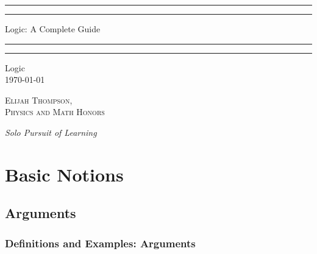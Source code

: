 \documentclass[12pt, a4paper, twoside, openright, titlepage]{book}
\begin{document}

\begin{titlepage}
    \centering
    \scshape
    \vspace*{\baselineskip}
    \rule{\textwidth}{1.6pt}\vspace*{-\baselineskip}\vspace*{2pt}
    \rule{\textwidth}{0.4pt}
    
    \vspace{0.75\baselineskip}
    
    {\LARGE Logic: A Complete Guide}
    
    \vspace{0.75\baselineskip}
    
    \rule{\textwidth}{0.4pt}\vspace*{-\baselineskip}\vspace{3.2pt}
    \rule{\textwidth}{1.6pt}
    
    \vspace{2\baselineskip}
    Logic \\
    \vspace*{3\baselineskip}
    \monthdayyeardate\today \\
    \vspace*{5.0\baselineskip}
    
    {\scshape\Large Elijah Thompson, \\ Physics and Math Honors\\}
    
    \vspace{1.0\baselineskip}
    \textit{Solo Pursuit of Learning}
\end{titlepage}

\tableofcontents

\part{Basic Notions}




\chapter{\textsection\textsection Arguments}


\section{\textsection Definitions and Examples: Arguments}
\end{document}
